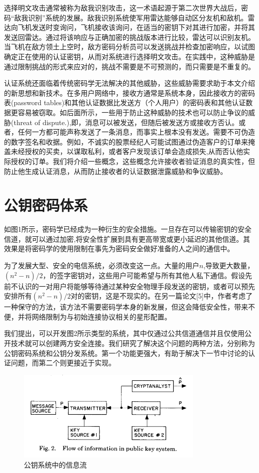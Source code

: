 \documentclass[]{article}
\begin{document}
	选择明文攻击通常被称为敌我识别攻击，这一术语起源于第二次世界大战后，密码“敌我识别”系统的发展。敌我识别系统使军用雷达能够自动区分友机和敌机。雷达向飞机发送时变询问，飞机接收该询问，在适当的密钥下对其进行加密，并将其发送回雷达。通过将该响应与正确加密的挑战版本进行比较，雷达可以识别友机。当飞机在敌方领土上空时，敌方密码分析员可以发送挑战并检查加密响应，以试图确定正在使用的认证密钥，从而对系统进行选择明文攻击。在实践中，这种威胁是通过限制挑战的形式来应对的，挑战不需要是不可预测的，而只需要是不重复的。
	
	
	认证系统还面临着传统密码学无法解决的其他威胁，这些威胁需要求助于本文介绍的新思想和新技术。在多用户网络中，接收方通常是系统本身，因此接收方的密码表(password tables)和其他认证数据比发送方（个人用户）的密码表和其他认证数据更容易被窃取。如后面所示，一些用于防止这种威胁的技术也可以防止争议的威胁(threat of dispute.),即，消息可以被发送，但随后被发送方或接收方否认。或者，任何一方都可能声称发送了一条消息，而事实上根本没有发送。需要不可伪造的数字签名和收据。例如，不诚实的股票经纪人可能试图通过伪造客户的订单来掩盖未经授权的买卖，以谋取私利，或者客户发现该订单会造成损失,从而否认他实际授权的订单。我们将介绍一些概念，这些概念允许接收者验证消息的真实性，但防止他生成认证消息，从而防止接收者的认证数据泄露威胁和争议威胁。
	
	\section{公钥密码体系}
	
	如图1所示，密码学已经成为一种衍生的安全措施。一旦存在可以传输密钥的安全信道，就可以通过加密,将安全性扩展到具有更高带宽或更小延迟的其他信道。其效果是将密码学的使用限制在事先为密码安全做好准备的人之间的通信中。
	
	为了发展大型、安全的电信系统，必须改变这一点。大量的用户$n$,导致更大数量，$(n^2-n)/2$，的签字密钥对，这些用户可能希望与所有其他人私下通信。假设先前不认识的一对用户将能够等待通过某种安全物理手段发送的密钥，或者可以预先安排所有$(n^2-n)/2$对的密钥，这是不现实的。在另一篇论文[5]中，作者考虑了一种保守的方法，该方法不需要密码学本身的新发展，但这会降低安全性，带来不便，并将网络限制为与初始连接协议相关的星形配置。
	
	我们提出，可以开发图2所示类型的系统，其中仅通过公共信道通信并且仅使用公开技术就可以创建两方安全连接。我们研究了解决这个问题的两种方法，分别称为公钥密码系统和公钥分发系统。第一个功能更强大，有助于解决下一节中讨论的认证问题，而第二个则更接近于实现。
	
	\begin{figure}[htbp]
		\centering
		\includegraphics[width=0.8\textwidth]{Fig2.png}
		\caption{公钥系统中的信息流}
		\label{Fig:fig2}
	\end{figure}
	
\end{document}
